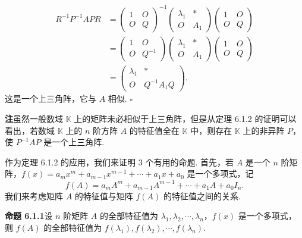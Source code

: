 \documentclass[UTF8,12pt,a4paper,fontset=fandol]{ctexart}
\begin{document}
\[
\begin{aligned}
R^{-1}P^{-1}APR
&=
\left(\begin{array}{cc}
1 & O\\
O & Q
\end{array}\right)^{-1}
\left(\begin{array}{cc}
\lambda_1 & *\\
O & A_1
\end{array}\right)
\left(\begin{array}{cc}
1 & O\\
O & Q
\end{array}\right)\\
&=
\left(\begin{array}{cc}
1 & O\\
O & Q^{-1}
\end{array}\right)
\left(\begin{array}{cc}
\lambda_1 & *\\
O & A_1
\end{array}\right)
\left(\begin{array}{cc}
1 & O\\
O & Q
\end{array}\right)\\
&=
\left(\begin{array}{cc}
\lambda_1 & *\\
O & Q^{-1}A_1Q
\end{array}\right).
\end{aligned}
\]
这是一个上三角阵，它与 $A$ 相似. $\square$

\noindent\textbf{注}\quad 虽然一般数域 $\mathbb{K}$ 上的矩阵未必相似于上三角阵，但是从定理 6.1.2 的证明可以看出，若数域 $\mathbb{K}$ 上的 $n$ 阶方阵 $A$ 的特征值全在 $\mathbb{K}$ 中，则存在 $\mathbb{K}$ 上的非异阵 $P$，使 $P^{-1}AP$ 是一个上三角阵.

作为定理 6.1.2 的应用，我们来证明 3 个有用的命题. 首先，若 $A$ 是一个 $n$ 阶矩阵，$f(x)=a_mx^m+a_{m-1}x^{m-1}+\cdots+a_1x+a_0$ 是一个多项式，记
\[
f(A)=a_mA^m+a_{m-1}A^{m-1}+\cdots+a_1A+a_0I_n.
\]
我们来考虑矩阵 $A$ 的特征值与矩阵 $f(A)$ 的特征值之间的关系.

\noindent\textbf{命题 6.1.1}\quad 设 $n$ 阶矩阵 $A$ 的全部特征值为 $\lambda_1,\lambda_2,\cdots,\lambda_n$，$f(x)$ 是一个多项式，则 $f(A)$ 的全部特征值为 $f(\lambda_1),f(\lambda_2),\cdots,f(\lambda_n)$.
\end{document}
